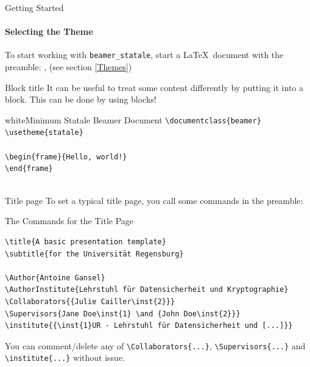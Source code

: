 \begin{frame}[fragile]{Getting Started}
\framesubtitle{Selecting the Theme}
To start working with \texttt{beamer\_statale}, start a \LaTeX\ document with the preamble:
\testcolor{\useBlockTitleColor}, \testcolor{\useBlockMainColor} (see section \ref{Themes})
\begin{themedTitleBlock}{Block title}
    It can be useful to treat some content differently by putting it into a block. This can be done by using blocks!
\end{themedTitleBlock}
\begin{colorblock}[black]{white}{Minimum Statale Beamer Document}
    \verb|\documentclass{beamer}|\\
    \verb|\usetheme{statale}|\\
    \verb||\\
    \verb|\begin{frame}{Hello, world!}|\\
    \verb|\end{frame}|\\
    \verb||\\
\end{colorblock}
\end{frame}


\begin{frame}[fragile]{Title page}
To set a typical title page, you call some commands in the preamble:
\begin{block}{The Commands for the Title Page}
\begin{verbatim}
\title{A basic presentation template}
\subtitle{for the Universität Regensburg}

\Author{Antoine Gansel}
\AuthorInstitute{Lehrstuhl für Datensicherheit und Kryptographie}
\Collaborators{{Julie Cailler\inst{2}}} 
\Supervisors{Jane Doe\inst{1} \and {John Doe\inst{2}}}
\institute{{\inst{1}UR - Lehrstuhl für Datensicherheit und [...]}}
\end{verbatim}
\end{block}

You can comment/delete any of \verb|\Collaborators{...}|, \verb|\Supervisors{...}| and \verb|\institute{...}| without issue.

\end{frame}



